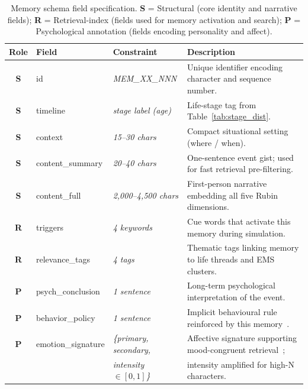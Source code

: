 \begin{table}[h]
\centering
\caption{Memory schema field specification. \textbf{S} = Structural (core identity and narrative fields); \textbf{R} = Retrieval-index (fields used for memory activation and search); \textbf{P} = Psychological annotation (fields encoding personality and affect).}
\label{tab:schema}
\small
\setlength{\tabcolsep}{5pt}
\renewcommand{\arraystretch}{1.25}
\begin{tabular}{>{\bfseries}cp{2.8cm}p{3.2cm}p{6.0cm}}
\toprule
\textbf{Role} & \textbf{Field} & \textbf{Constraint} & \textbf{Description} \\
\midrule
\rowcolor{blue!8}
S & id               & \textit{MEM\_XX\_NNN}          & Unique identifier encoding character and sequence number. \\
\rowcolor{blue!8}
S & timeline         & \textit{stage label (age)}     & Life-stage tag from Table~\ref{tab:stage_dist}. \\
\rowcolor{blue!8}
S & context          & \textit{15--30 chars}          & Compact situational setting (where / when). \\
\rowcolor{blue!8}
S & content\_summary & \textit{20--40 chars}          & One-sentence event gist; used for fast retrieval pre-filtering. \\
\rowcolor{blue!8}
S & content\_full    & \textit{2{,}000--4{,}500 chars}    & First-person narrative embedding all five Rubin dimensions. \\
\midrule
\rowcolor{green!8}
R & triggers         & \textit{4 keywords}            & Cue words that activate this memory during simulation. \\
\rowcolor{green!8}
R & relevance\_tags  & \textit{4 tags}                & Thematic tags linking memory to life threads and EMS clusters. \\
\midrule
\rowcolor{orange!8}
P & psych\_conclusion  & \textit{1 sentence}          & Long-term psychological interpretation of the event. \\
\rowcolor{orange!8}
P & behavior\_policy   & \textit{1 sentence}          & Implicit behavioural rule reinforced by this memory~\cite{young2006schema}. \\
\rowcolor{orange!8}
P & emotion\_signature & \textit{\{primary, secondary,}        & Affective signature supporting mood-congruent retrieval~\cite{bower1981}; \\
\rowcolor{orange!8}
  &                    & \textit{\quad intensity $\in [0,1]$\}} & intensity amplified for high-N characters. \\
\bottomrule
\end{tabular}
\end{table}



